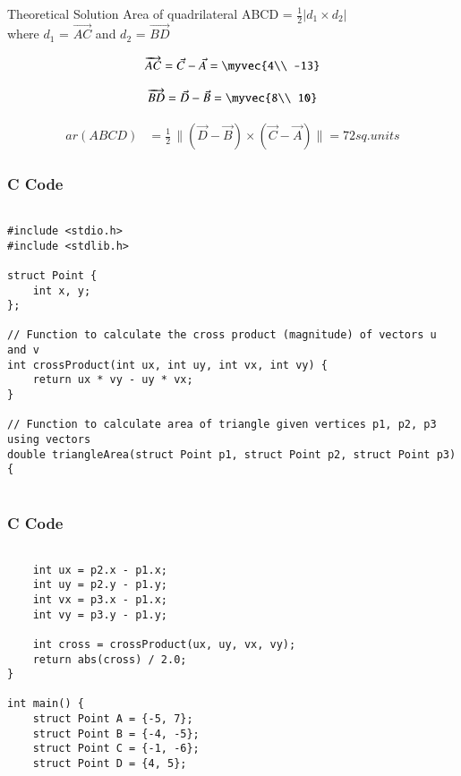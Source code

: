 \documentclass{beamer}
\begin{document}
\begin{frame}{Theoretical Solution}
Area of quadrilateral ABCD = $\frac{1}{2}|d_{1}\times d_{2}|$\\
where $d_{1}$ = $\overrightarrow{AC}$  and $d_{2}$ = $\overrightarrow{BD}$


\begin{align}
    \overrightarrow{AC}  =   \vec{C}   -   \vec{A}   =  \myvec{4\\
-13}
\end{align}

\begin{align}
    \overrightarrow{BD}  =   \vec{D}   -   \vec{B}   =  \myvec{8\\
10}
\end{align}

\begin{align}
ar(ABCD) &= \frac{1}{2} \, \|(\vec{D} - \vec{B}) \times (\vec{C} - \vec{A}) \|  =  72  sq. units
\end{align}




\end{frame}


\begin{frame}[fragile]
    \frametitle{C Code }
    \begin{lstlisting}

#include <stdio.h>
#include <stdlib.h>

struct Point {
    int x, y;
};

// Function to calculate the cross product (magnitude) of vectors u and v
int crossProduct(int ux, int uy, int vx, int vy) {
    return ux * vy - uy * vx;
}

// Function to calculate area of triangle given vertices p1, p2, p3 using vectors
double triangleArea(struct Point p1, struct Point p2, struct Point p3) {


    \end{lstlisting}
\end{frame}

\begin{frame}[fragile]
    \frametitle{C Code }
    \begin{lstlisting}

    int ux = p2.x - p1.x;
    int uy = p2.y - p1.y;
    int vx = p3.x - p1.x;
    int vy = p3.y - p1.y;

    int cross = crossProduct(ux, uy, vx, vy);
    return abs(cross) / 2.0;
}

int main() {
    struct Point A = {-5, 7};
    struct Point B = {-4, -5};
    struct Point C = {-1, -6};
    struct Point D = {4, 5};







    \end{lstlisting}
\end{frame}
\end{document}
